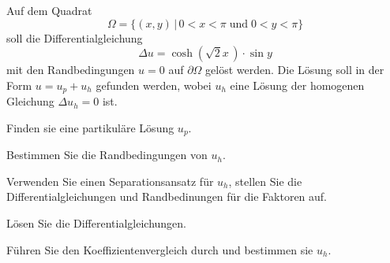 Auf dem Quadrat
\begin{equation}
\Omega = \{ (x,y)\,|\, 0<x<\pi \;\text{und}\; 0 < y < \pi \}
\label{40000019:domain}
\end{equation}
soll die Differentialgleichung
\begin{equation}
\Delta u = \cosh(\!\sqrt{2}x\,)\cdot \sin y
\label{40000019:pde}
\end{equation}
mit den Randbedingungen $u=0$ auf $\partial\Omega$ gelöst werden.
Die Lösung soll in der Form $u=u_p+u_h$ gefunden werden, wobei
$u_h$ eine Lösung der homogenen Gleichung $\Delta u_h=0$ ist.
\begin{teilaufgaben}
\item
Finden sie eine partikuläre Lösung $u_p$.
\item
Bestimmen Sie die Randbedingungen von $u_h$.
\item
Verwenden Sie einen Separationsansatz für $u_h$, stellen Sie die
Differentialgleichungen und Randbedinungen für die Faktoren auf.
\item
Lösen Sie die Differentialgleichungen.
\item
Führen Sie den Koeffizientenvergleich durch und bestimmen sie $u_h$.
\end{teilaufgaben}


